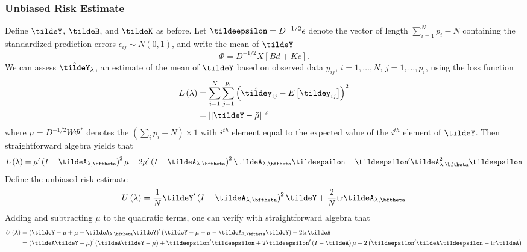 \subsubsection{Unbiased Risk Estimate}

Define  $\tildeY$, $\tildeB$, and $\tildeK$ as before. Let $\tildeepsilon = D^{-1/2} \epsilon$ denote the vector of length  $\sum_{i = 1}^N p_i - N$ containing the standardized prediction errors $\epsilon_{ij} \sim N\left(0,1\right)$, and write the mean of $\tildeY$ 
\begin{equation} 
\Phi = D^{-1/2} X \left[ Bd + Kc \right].
\end{equation}
\noindent
We can assess $\hat{\tildeY}_\lambda$, an estimate of the mean of $\tildeY$ based on observed data $y_{ij}$, $i = 1,\dots, N$, $j = 1,\dots, p_i$, using the loss function
\begin{align}
\begin{split}
L\left(\lambda\right) &= \sum_{i = 1}^N \sum_{j = 1}^{p_i} \left(\hat{\tildey}_{ij} - E\left[\tildey_{ij}\right] \right)^2\\
&= \vert \vert \tildeY - \tilde{\mu} \vert \vert^2
\end{split}
\end{align}
\noindent
where $\mu = D^{-1/2}W \Phi^*$ denotes the $\left( \sum \limits_{i} p_i - N\right) \times 1$ with $i^{th}$ element equal to the expected value of the  $i^{th}$ element of $\tildeY$.  Then straightforward algebra yields that 
\begin{align} 
L\left(\lambda\right) = \mu'\left( I - \tildeA_{\lambda,\bftheta} \right)^2\mu - 2\mu'\left( I - \tildeA_{\lambda,\bftheta} \right)^2 \tildeA_{\lambda,\bftheta} \tildeepsilon + \tildeepsilon' \tildeA_{\lambda,\bftheta}^2 \tildeepsilon
\end{align}
Define the unbiased risk estimate
\begin{equation} 
U\left(\lambda\right) = \frac{1}{N}\tildeY'\left( I - \tildeA_{\lambda,\bftheta} \right)^2\tildeY + \frac{2}{N}\mbox{tr}\tildeA_{\lambda,\bftheta}
\end{equation}
 \noindent
Adding and subtracting $\mu$ to the quadratic terms, one can verify with straightforward algebra that
\begin{align}
\begin{split}
U\left(\lambda\right) &= \left( \tildeY - \mu + \mu - \tildeA_{\lambda,\bftheta} \tildeY \right)'\left( \tildeY - \mu + \mu - \tildeA_{\lambda,\bftheta} \tildeY \right) + 2\mbox{tr}\tildeA \\
&= \left(\tildeA \tildeY - \mu \right)'\left( \tildeA \tildeY - \mu \right) + \tildeepsilon'\tildeepsilon + 2\tildeepsilon' \left( I- \tildeA\right)\mu- 2\left( \tildeepsilon'\tildeA \tildeepsilon -  \mbox{tr}\tildeA\right)
\end{split}
\end{align}
